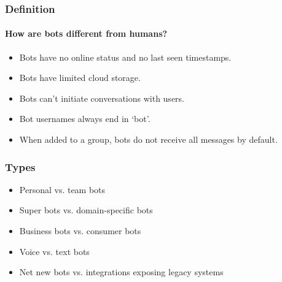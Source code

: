 \documentclass[11pt]{beamer}
\begin{document}
\begin{frame}
\frametitle{Definition}
\framesubtitle{How are bots different from humans?}
\begin{itemize}
		\item Bots have no online status and no last seen timestamps.
		\item Bots have limited cloud storage.
		\item Bots can't initiate conversations with users.
		\item Bot usernames always end in ‘bot’.
		\item When added to a group, bots do not receive all messages by default.
\end{itemize}
\end{frame}

\begin{frame}
	\frametitle{Types}
	\begin{itemize}
		\item Personal vs. team bots
		\item Super bots vs. domain-specific bots
		\item Business bots vs. consumer bots
		\item Voice vs. text bots %
		\item Net new bots vs. integrations exposing legacy systems
	\end{itemize}
\end{frame}

\end{document}
